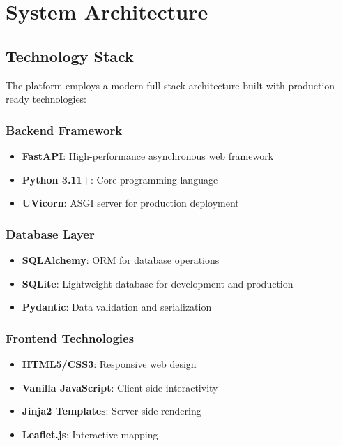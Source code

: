 \documentclass[11pt,a4paper]{article}
\begin{document}
\section{System Architecture}
\label{sec:architecture}

\subsection{Technology Stack}

The platform employs a modern full-stack architecture built with production-ready technologies:

\subsubsection{Backend Framework}
\begin{itemize}
    \item \textbf{FastAPI}: High-performance asynchronous web framework
    \item \textbf{Python 3.11+}: Core programming language
    \item \textbf{UVicorn}: ASGI server for production deployment
\end{itemize}

\subsubsection{Database Layer}
\begin{itemize}
    \item \textbf{SQLAlchemy}: ORM for database operations
    \item \textbf{SQLite}: Lightweight database for development and production
    \item \textbf{Pydantic}: Data validation and serialization
\end{itemize}

\subsubsection{Frontend Technologies}
\begin{itemize}
    \item \textbf{HTML5/CSS3}: Responsive web design
    \item \textbf{Vanilla JavaScript}: Client-side interactivity
    \item \textbf{Jinja2 Templates}: Server-side rendering
    \item \textbf{Leaflet.js}: Interactive mapping
\end{itemize}
\end{document}
